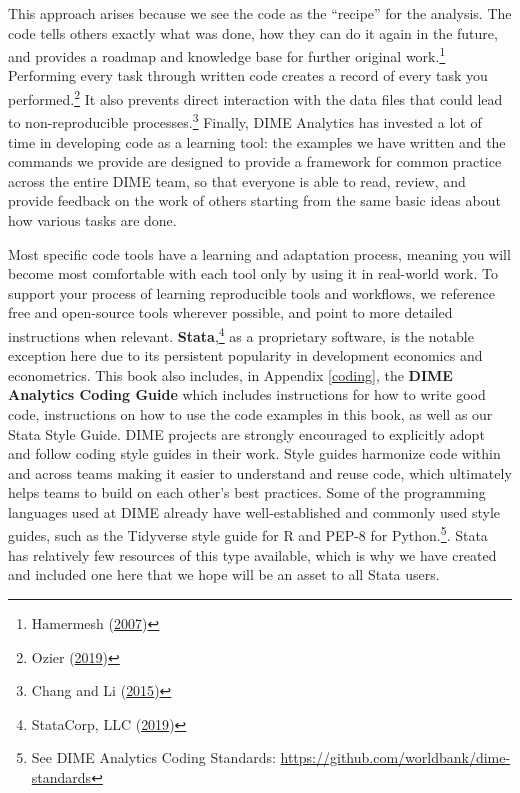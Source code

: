 \documentclass[
]{book}
\begin{document}
This approach arises because we see the code as the ``recipe'' for the analysis.
The code tells others exactly what was done,
how they can do it again in the future,
and provides a roadmap and knowledge base for further original work.\footnote{Hamermesh (\protect\hyperlink{ref-hamermesh2007replication}{2007})}
Performing every task through written code
creates a record of every task you performed.\footnote{Ozier (\protect\hyperlink{ref-ozier2019replication}{2019})}
It also prevents direct interaction
with the data files that could lead to non-reproducible processes.\footnote{Chang and Li (\protect\hyperlink{ref-chang2015economics}{2015})}
Finally, DIME Analytics has invested a lot of time in developing code as a learning tool:
the examples we have written and the commands we provide
are designed to provide a framework for common practice
across the entire DIME team, so that everyone is able to
read, review, and provide feedback on the work of others
starting from the same basic ideas about how various tasks are done.

Most specific code tools have a learning and adaptation process,
meaning you will become most comfortable with each tool
only by using it in real-world work.
To support your process of learning reproducible tools and workflows,
we reference free and open-source tools wherever possible,
and point to more detailed instructions when relevant.
\textbf{Stata},\footnote{StataCorp, LLC (\protect\hyperlink{ref-statacorp2019stata}{2019})}
as a proprietary software, is the notable exception here
due to its persistent popularity in development economics and econometrics.
This book also includes, in Appendix \ref{coding},
the \textbf{DIME Analytics Coding Guide}
which includes instructions for how to write good code,
instructions on how to use the code examples in this book,
as well as our Stata Style Guide.
DIME projects are strongly encouraged to
explicitly adopt and follow coding style guides in their work.
Style guides harmonize code within and across teams
making it easier to understand and reuse code,
which ultimately helps teams to
build on each other's best practices.
Some of the programming languages used at DIME
already have well-established and commonly used style guides,
such as the Tidyverse style guide for R
and PEP-8 for Python.\footnote{See DIME Analytics Coding Standards:
  \url{https://github.com/worldbank/dime-standards}}.
Stata has relatively few resources of this type available,
which is why we have created and included one here that
we hope will be an asset to all Stata users.
\end{document}
